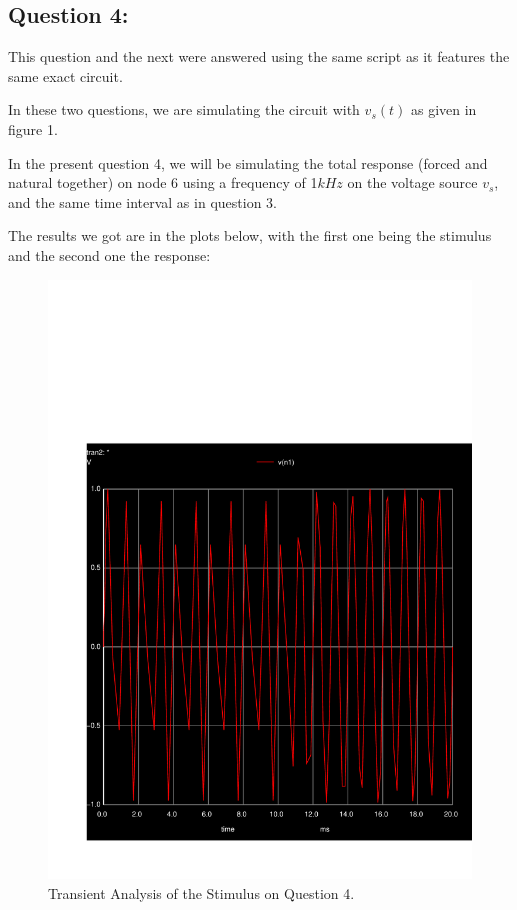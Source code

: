 \subsection{Question 4: }
This question and the next were answered using the same script as it features the same exact circuit. \par
In these two questions, we are simulating the circuit with $v_s(t)$ as given in figure 1.\par
In the present question 4, we will be simulating the total response (forced and natural together) on node 6 using a frequency of 1$kHz$ on the voltage source $v_s$, and the same time interval as in question 3. \par
The results we got are in the plots below, with the first one being the stimulus and the second one the response:
\begin{figure}[H] \centering
\includegraphics[width=0.7\linewidth]{../sim/transient4s.pdf}
\caption{Transient Analysis of the Stimulus on Question 4.}
\label{fig:transient4s}
\end{figure}

